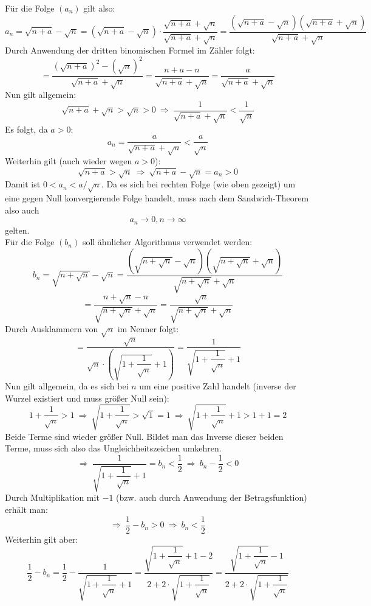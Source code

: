 \documentclass[10pt, a4paper]{article}
\begin{document}
		Für die Folge $(a_n)$ gilt also:
		\[
			a_n = \sqrt{n+a}-\sqrt{n} = \left(\sqrt{n+a}-\sqrt{n}\right)\cdot \dfrac{\sqrt{n+a}+\sqrt{n}}{\sqrt{n+a}+\sqrt{n}} = \dfrac{\left(\sqrt{n+a}-\sqrt{n}\right)\left(\sqrt{n+a}+\sqrt{n}\right)}{\sqrt{n+a}+\sqrt{n}}
		\]
		Durch Anwendung der dritten binomischen Formel im Zähler folgt:
		\[
			= \dfrac{\left(\sqrt{n+a}\right)^2-\left(\sqrt{n}\right)^2}{\sqrt{n+a}+\sqrt{n}} = \dfrac{n+a-n}{\sqrt{n+a}+\sqrt{n}} = \dfrac{a}{\sqrt{n+a}+\sqrt{n}}
		\]
		Nun gilt allgemein:
		\[
			\sqrt{n+a} +\sqrt{n} > \sqrt{n} > 0 \ \Rightarrow \ \dfrac{1}{\sqrt{n+a} +\sqrt{n}} < \dfrac{1}{\sqrt{n}}
		\]
		Es folgt, da $a > 0$:
		\[
			a_n = \dfrac{a}{\sqrt{n+a}+\sqrt{n}} < \dfrac{a}{\sqrt{n}}
		\]
		Weiterhin gilt (auch wieder wegen $a > 0$):
		\[
			\sqrt{n+a} > \sqrt{n} \ \Rightarrow \ \sqrt{n+a}-\sqrt{n} = a_n > 0
		\]
		Damit ist $0<a_n<a/\sqrt{n}$. Da es sich bei rechten Folge (wie oben gezeigt) um eine gegen Null konvergierende Folge handelt, muss nach dem Sandwich-Theorem also auch
		\[
			a_n \longrightarrow 0, n\longrightarrow \infty
		\]
		gelten.\\
		Für die Folge $(b_n)$ soll ähnlicher Algorithmus verwendet werden:
		\[
			b_n = \sqrt{n+\sqrt{n}}-\sqrt{n} = \dfrac{\left(\sqrt{n+\sqrt{n}}-\sqrt{n}\right)\left(\sqrt{n+\sqrt{n}}+\sqrt{n}\right)}{\sqrt{n+\sqrt{n}}+\sqrt{n}}
		\]
		\[
			= \dfrac{n+\sqrt{n}-n}{\sqrt{n+\sqrt{n}}+\sqrt{n}} = \dfrac{\sqrt{n}}{\sqrt{n+\sqrt{n}}+\sqrt{n}} 
		\]
		Durch Ausklammern von $\sqrt{n}$ im Nenner folgt:
		\[
			= \dfrac{\sqrt{n}}{\sqrt{n}\cdot \left(\sqrt{1+\dfrac{1}{\sqrt{n}}}+1\right)} = \dfrac{1}{\sqrt{1+\dfrac{1}{\sqrt{n}}}+1}
		\]
		Nun gilt allgemein, da es sich bei $n$ um eine positive Zahl handelt (inverse der Wurzel existiert und muss größer Null sein):
		\[
			1+\dfrac{1}{\sqrt{n}} > 1 \ \Rightarrow \ \sqrt{1+\dfrac{1}{\sqrt{n}}} > \sqrt{1} = 1 \ \Rightarrow \ \sqrt{1+\dfrac{1}{\sqrt{n}}} + 1 > 1+1 = 2
		\]
		Beide Terme sind wieder größer Null. Bildet man das Inverse dieser beiden Terme, muss sich also das Ungleichheitszeichen umkehren.
		\[
			\Rightarrow \ \dfrac{1}{\sqrt{1+\dfrac{1}{\sqrt{n}}}+1} = b_n < \dfrac{1}{2} \ \Rightarrow \ b_n -\dfrac{1}{2} < 0
		\]
		Durch Multiplikation mit $-1$ (bzw. auch durch Anwendung der Betragsfunktion) erhält man:
		\[
			\Rightarrow \ \dfrac{1}{2}-b_n > 0 	\ \Rightarrow \ b_n < \dfrac{1}{2}
		\] 
		Weiterhin gilt aber:
		\[
			\dfrac{1}{2}-b_n = \dfrac{1}{2} - \dfrac{1}{\sqrt{1+\dfrac{1}{\sqrt{n}}}+1} = \dfrac{\sqrt{1+\dfrac{1}{\sqrt{n}}}+1 - 2}{2+2\cdot\sqrt{1+\dfrac{1}{\sqrt{n}}}} = \dfrac{\sqrt{1+\dfrac{1}{\sqrt{n}}} - 1}{2+2\cdot\sqrt{1+\dfrac{1}{\sqrt{n}}}}
		\]
\end{document}

